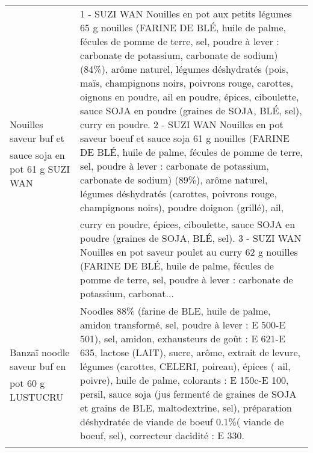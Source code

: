 \begin{longtable}{p{5cm}p{10cm}}
                                                  Nouilles saveur buf et sauce soja en pot 61 g SUZI WAN &  1 - SUZI WAN Nouilles en pot aux petits légumes 65 g  nouilles (FARINE DE BLÉ, huile de palme, fécules de pomme de terre, sel, poudre à lever : carbonate de potassium, carbonate de sodium) (84\%), arôme naturel, légumes déshydratés (pois, maïs, champignons noirs, poivrons rouge, carottes, oignons en poudre, ail en poudre, épices, ciboulette, sauce SOJA en poudre (graines de SOJA, BLÉ, sel), curry en poudre.  2 - SUZI WAN Nouilles en pot saveur boeuf et sauce soja 61 g  nouilles (FARINE DE BLÉ, huile de palme, fécules de pomme de terre, sel, poudre à lever : carbonate de potassium, carbonate de sodium) (89\%), arôme naturel, légumes déshydratés (carottes, poivrons rouge, champignons noirs), poudre doignon (grillé), ail, curry en poudre, épices, ciboulette, sauce SOJA en poudre (graines de SOJA, BLÉ, sel).  3 - SUZI WAN Nouilles en pot saveur poulet au curry 62 g  nouilles (FARINE DE BLÉ, huile de palme, fécules de pomme de terre, sel, poudre à lever : carbonate de potassium, carbonat... \\
                                                           Banzaï noodle saveur buf en pot 60 g LUSTUCRU &                                                                                                                                                                                                                                                                                                                                                                                                                                                                                                                               Noodles 88\% (farine de BLE, huile de palme, amidon transformé, sel, poudre à lever : E 500-E 501), sel, amidon, exhausteurs de goût : E 621-E 635, lactose (LAIT), sucre, arôme, extrait de levure, légumes (carottes, CELERI, poireau), épices ( ail, poivre), huile de palme, colorants : E 150c-E 100, persil, sauce soja (jus fermenté de graines de SOJA et grains de BLE, maltodextrine, sel), préparation déshydratée de viande de boeuf 0.1\%( viande de boeuf, sel), correcteur dacidité : E 330. \\

\end{longtable}
